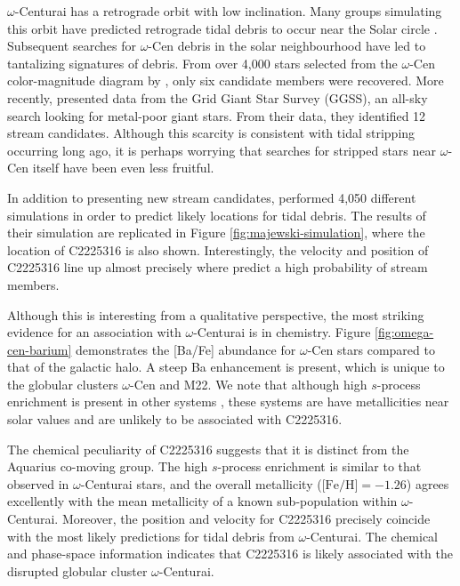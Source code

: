 \documentclass{emulateapj}
\begin{document}
$\omega$-Centurai has a retrograde orbit with low inclination. Many groups simulating this orbit have predicted retrograde tidal debris to occur near the Solar circle \citep{dinescu_2002,tsuchiya_2003,tsuchiya_2004,mizutani_2003,bekki;freeman_2003}. Subsequent searches for $\omega$-Cen debris in the solar neighbourhood have led to tantalizing signatures of debris. From over 4,000 stars selected from the $\omega$-Cen color-magnitude diagram by \citet{da_costa;coleman_2008}, only six candidate members were recovered. More recently, \citet{majewski;et-al_2012} presented data from the Grid Giant Star Survey (GGSS), an all-sky search looking for metal-poor giant stars. From their data, they identified 12 stream candidates. Although this scarcity is consistent with tidal stripping occurring long ago, it is perhaps worrying that searches for stripped stars near $\omega$-Cen itself have been even less fruitful.

In addition to presenting new stream candidates, \citet{majewski;et-al_2012} performed 4,050 different simulations in order to predict likely locations for tidal debris. The results of their simulation are replicated in Figure \ref{fig:majewski-simulation}, where the location of C2225316 is also shown. Interestingly, the velocity and position of C2225316 line up almost precisely where \citet{majewski;et-al_2012} predict a high probability of stream members. 

Although this is interesting from a qualitative perspective, the most striking evidence for an association with $\omega$-Centurai is in chemistry. Figure \ref{fig:omega-cen-barium} demonstrates the [Ba/Fe] abundance for $\omega$-Cen stars compared to that of the galactic halo. A steep Ba enhancement is present, which is unique to the globular clusters $\omega$-Cen and M22. We note that although high $s$-process enrichment is present in other systems \citep[IC 2391, the Argus association;][]{de_silva;et-al_2013}, these systems are have metallicities near solar values and are unlikely to be associated with C2225316.


The chemical peculiarity of C2225316 suggests that it is distinct from the Aquarius co-moving group. The high $s$-process enrichment is similar to that observed in $\omega$-Centurai stars, and the overall metallicity ($\mbox{[Fe/H]} = -1.26$) agrees excellently with the mean metallicity of a known sub-population within $\omega$-Centurai. Moreover, the position and velocity for C2225316 precisely coincide with the most likely predictions for tidal debris from $\omega$-Centurai. The chemical and phase-space information indicates that C2225316 is likely associated with the disrupted globular cluster $\omega$-Centurai.
\end{document}
